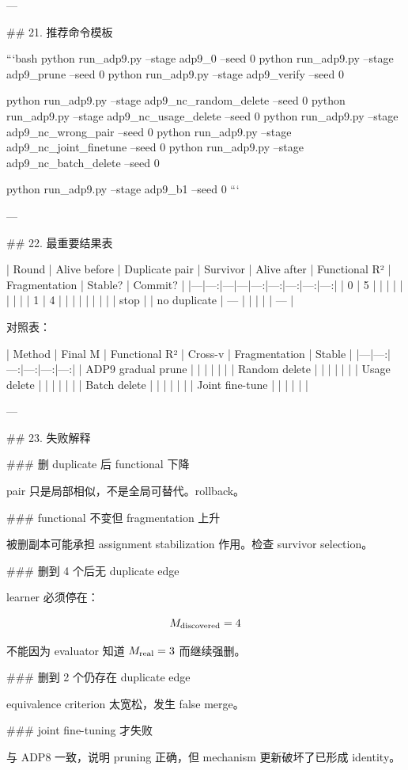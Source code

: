 ---

## 21. 推荐命令模板

```bash
python run_adp9.py --stage adp9_0 --seed 0
python run_adp9.py --stage adp9_prune --seed 0
python run_adp9.py --stage adp9_verify --seed 0

python run_adp9.py --stage adp9_nc_random_delete --seed 0
python run_adp9.py --stage adp9_nc_usage_delete --seed 0
python run_adp9.py --stage adp9_nc_wrong_pair --seed 0
python run_adp9.py --stage adp9_nc_joint_finetune --seed 0
python run_adp9.py --stage adp9_nc_batch_delete --seed 0

python run_adp9.py --stage adp9_b1 --seed 0
```

---

## 22. 最重要结果表

| Round | Alive before | Duplicate pair | Survivor | Alive after | Functional R² | Fragmentation | Stable? | Commit? |
|---|---:|---|---|---:|---:|---:|---:|---:|
| 0 | 5 |  |  |  |  |  |  |  |
| 1 | 4 |  |  |  |  |  |  |  |
| stop |  | no duplicate | — |  |  |  |  | — |

对照表：

| Method | Final M | Functional R² | Cross-v | Fragmentation | Stable |
|---|---:|---:|---:|---:|---:|
| ADP9 gradual prune |  |  |  |  |  |
| Random delete |  |  |  |  |  |
| Usage delete |  |  |  |  |  |
| Batch delete |  |  |  |  |  |
| Joint fine-tune |  |  |  |  |  |

---

## 23. 失败解释

### 删 duplicate 后 functional 下降

pair 只是局部相似，不是全局可替代。rollback。

### functional 不变但 fragmentation 上升

被删副本可能承担 assignment stabilization 作用。检查 survivor selection。

### 删到 4 个后无 duplicate edge

learner 必须停在：

\[
M_{\rm discovered}=4
\]

不能因为 evaluator 知道 \(M_{\rm real}=3\) 而继续强删。

### 删到 2 个仍存在 duplicate edge

equivalence criterion 太宽松，发生 false merge。

### joint fine-tuning 才失败

与 ADP8 一致，说明 pruning 正确，但 mechanism 更新破坏了已形成 identity。

